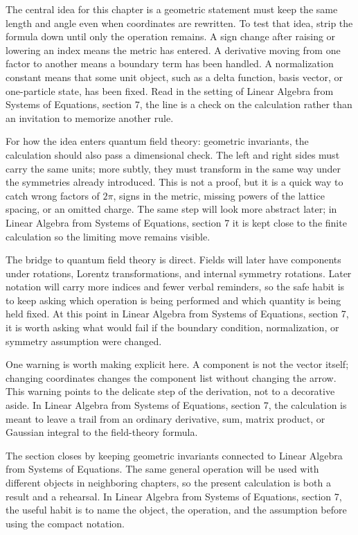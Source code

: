 The central idea for this chapter is a geometric statement must keep the same length and angle even when coordinates are rewritten.  To test that idea, strip the formula down until only the operation remains.  A sign change after raising or lowering an index means the metric has entered.  A derivative moving from one factor to another means a boundary term has been handled.  A normalization constant means that some unit object, such as a delta function, basis vector, or one-particle state, has been fixed.  Read in the setting of Linear Algebra from Systems of Equations, section 7, the line is a check on the calculation rather than an invitation to memorize another rule.

For how the idea enters quantum field theory: geometric invariants, the calculation should also pass a dimensional check.  The left and right sides must carry the same units; more subtly, they must transform in the same way under the symmetries already introduced.  This is not a proof, but it is a quick way to catch wrong factors of \(2\pi\), signs in the metric, missing powers of the lattice spacing, or an omitted charge.  The same step will look more abstract later; in Linear Algebra from Systems of Equations, section 7 it is kept close to the finite calculation so the limiting move remains visible.

The bridge to quantum field theory is direct.  Fields will later have components under rotations, Lorentz transformations, and internal symmetry rotations.  Later notation will carry more indices and fewer verbal reminders, so the safe habit is to keep asking which operation is being performed and which quantity is being held fixed.  At this point in Linear Algebra from Systems of Equations, section 7, it is worth asking what would fail if the boundary condition, normalization, or symmetry assumption were changed.

One warning is worth making explicit here.  A component is not the vector itself; changing coordinates changes the component list without changing the arrow.  This warning points to the delicate step of the derivation, not to a decorative aside.  In Linear Algebra from Systems of Equations, section 7, the calculation is meant to leave a trail from an ordinary derivative, sum, matrix product, or Gaussian integral to the field-theory formula.

The section closes by keeping geometric invariants connected to Linear Algebra from Systems of Equations.  The same general operation will be used with different objects in neighboring chapters, so the present calculation is both a result and a rehearsal.  In Linear Algebra from Systems of Equations, section 7, the useful habit is to name the object, the operation, and the assumption before using the compact notation.



